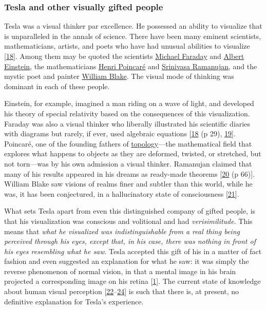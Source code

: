 \documentclass[
  a4paper,
]{article}
\begin{document}
\hypertarget{tesla-and-other-visually-gifted-people}{%
\subsubsection{Tesla and other visually gifted
people}\label{tesla-and-other-visually-gifted-people}}

Tesla was a visual thinker par excellence. He possessed an ability to
visualize that is unparalleled in the annals of science. There have been
many eminent scientists, mathematicians, artists, and poets who have had
unusual abilities to visualize {[}\protect\hyperlink{ref-west91}{18}{]}.
Among them may be quoted the scientists
\href{https://en.wikipedia.org/wiki/Michael_Faraday}{Michael Faraday}
and \href{https://en.wikipedia.org/wiki/Albert_Einstein}{Albert
Einstein}, the mathematicians
\href{https://en.wikipedia.org/wiki/Henri_Poincar\%C3\%A9}{Henri
Poincaré} and
\href{https://en.wikipedia.org/wiki/Srinivasa_Ramanujan}{Srinivasa
Ramanujan}, and the mystic poet and painter
\href{https://en.wikipedia.org/wiki/William_Blake}{William Blake}. The
visual mode of thinking was dominant in each of these people.

Einstein, for example, imagined a man riding on a wave of light, and
developed his theory of special relativity based on the consequences of
this visualization. Faraday was also a visual thinker who liberally
illustrated his scientific diaries with diagrams but rarely, if ever,
used algebraic equations {[}\protect\hyperlink{ref-west91}{18} (p 29),
\protect\hyperlink{ref-koestler64}{19}{]}. Poincaré, one of the founding
fathers of
\href{https://mathworld.wolfram.com/Topology.html}{topology}---the
mathematical field that explores what happens to objects as they are
deformed, twisted, or stretched, but not torn---was by his own admission
a visual thinker. Ramanujan claimed that many of his results appeared in
his dreams as ready-made theorems
{[}\protect\hyperlink{ref-kanigel91}{20} (p 66){]}. William Blake saw
visions of realms finer and subtler than this world, while he was, it
has been conjectured, in a hallucinatory state of consciousness
{[}\protect\hyperlink{ref-mckim72}{21}{]}.

What sets Tesla apart from even this distinguished company of gifted
people, is that his visualization was conscious and volitional and had
\emph{verisimilitude}. This means that \emph{what he visualized was
indistinguishable from a real thing being perceived through his eyes,
except that, in his case, there was nothing in front of his eyes
resembling what he saw}. Tesla accepted this gift of his in a matter of
fact fashion and even suggested an explanation for what he saw: it was
simply the reverse phenomenon of normal vision, in that a mental image
in his brain projected a corresponding image on his retina
{[}\protect\hyperlink{ref-john83}{1}{]}. The current state of knowledge
about human visual perception
{[}\protect\hyperlink{ref-hubel88}{22}--\protect\hyperlink{ref-pvi97}{24}{]}
is such that there is, at present, no definitive explanation for Tesla's
experience.
\end{document}
